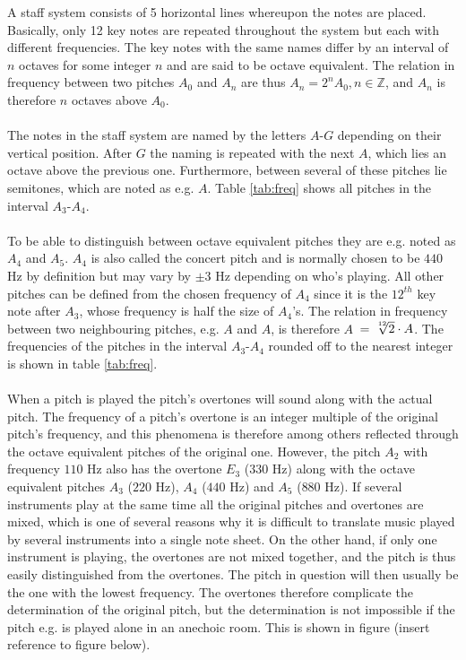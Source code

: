 \noindent
A staff system consists of 5 horizontal lines whereupon the notes are placed. Basically, only 12 key notes are repeated throughout the system but each with different frequencies. The key notes with the same names differ by an interval of $n$ octaves for some integer $n$ and are said to be octave equivalent. \cite{MusicTheory} The relation in frequency between two pitches $A_0$ and $A_n$ are thus $A_n = 2^n A_0, n \in \mathbb{Z}$, and $A_n$ is therefore $n$ octaves above $A_0$.
\\ \\
The notes in the staff system are named by the letters $A$-$G$ depending on their vertical position. After $G$ the naming is repeated with the next $A$, which lies an octave above the previous one. Furthermore, between several of these pitches lie semitones, which are noted as e.g. $A$\hashsharp{}. Table \ref{tab:freq} shows all pitches in the interval $A_3$-$A_4$.
\\ \\
To be able to distinguish between octave equivalent pitches they are e.g. noted as $A_4$ and $A_5$. $A_4$ is also called the concert pitch and is normally chosen to be $440$ Hz by definition but may vary by $\pm 3$ Hz depending on who's playing. All other pitches can be defined from the chosen frequency of $A_4$ since it is the $12^{th}$ key note after $A_3$, whose frequency is half the size of $A_4$'s. The relation in frequency between two neighbouring pitches, e.g. $A$ and $A$\hashsharp, is therefore $A$\hashsharp \ $= \sqrt[\leftroot{-2}\uproot{2}12]{2} \cdot A$. \cite{MusicTheory} The frequencies of the pitches in the interval $A_3$-$A_4$ rounded off to the nearest integer is shown in table \ref{tab:freq}.
\\ \\
When a pitch is played the pitch's overtones will sound along with the actual pitch. The frequency of a pitch's overtone is an integer multiple of the original pitch's frequency, and this phenomena is therefore among others reflected through the octave equivalent pitches of the original one. However, the pitch $A_2$ with frequency $110$ Hz also has the overtone $E_3$ ($330$ Hz) along with the octave equivalent pitches $A_3$ ($220$ Hz), $A_4$ ($440$ Hz) and $A_5$ ($880$ Hz). If several instruments play at the same time all the original pitches and overtones are mixed, which is one of several reasons why it is difficult to translate music played by several instruments into a single note sheet. On the other hand, if only one instrument is playing, the overtones are not mixed together, and the pitch is thus easily distinguished from the overtones. The pitch in question will then usually be the one with the lowest frequency. The overtones therefore complicate the determination of the original pitch, but the determination is not impossible if the pitch e.g. is played alone in an anechoic room. This is shown in figure (insert reference to figure below).

